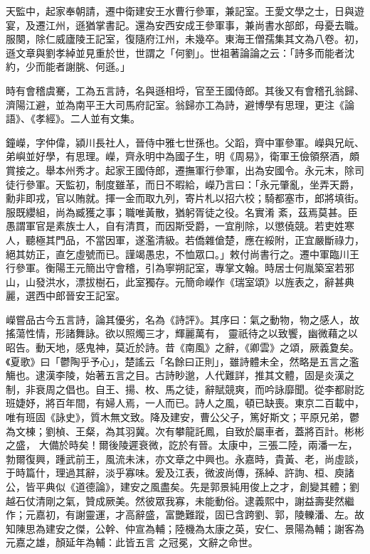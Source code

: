 \begin{pinyinscope}
 天監中，起家奉朝請，遷中衛建安王水曹行參軍，兼記室。王愛文學之士，日與遊宴，及遷江州，遜猶掌書記。還為安西安成王參軍事，兼尚書水部郎，母憂去職。服闋，除仁威廬陵王記室，復隨府江州，未幾卒。東海王僧孺集其文為八卷。初，遜文章與劉孝綽並見重於世，世謂之「何劉」。世祖著論論之云：「詩多而能者沈約，少而能者謝朓、何遜。」



 時有會稽虞騫，工為五言詩，名與遜相埒，官至王國侍郎。其後又有會稽孔翁歸、
 濟陽江避，並為南平王大司馬府記室。翁歸亦工為詩，避博學有思理，更注《論語》、《孝經》。二人並有文集。



 鐘嶸，字仲偉，潁川長社人，晉侍中雅七世孫也。父蹈，齊中軍參軍。嶸與兄岏、弟嶼並好學，有思理。嶸，齊永明中為國子生，明《周易》，衛軍王儉領祭酒，頗賞接之。舉本州秀才。起家王國侍郎，遷撫軍行參軍，出為安國令。永元末，除司徒行參軍。天監初，制度雖革，而日不暇給，嶸乃言曰：「永元肇亂，坐弄天爵，勳非即戎，官以賄就。揮一金而取九列，寄片札以招六校；騎都塞市，郎將填街。服既纓組，尚為臧獲之事；職唯黃散，猶躬胥徒之役。名實淆
 紊，茲焉莫甚。臣愚謂軍官是素族士人，自有清貫，而因斯受爵，一宜削除，以懲僥競。若吏姓寒人，聽極其門品，不當因軍，遂濫清級。若僑雜傖楚，應在綏附，正宜嚴斷祿力，絕其妨正，直乞虛號而已。謹竭愚忠，不恤眾口。」敕付尚書行之。遷中軍臨川王行參軍。衡陽王元簡出守會稽，引為寧朔記室，專掌文翰。時居士何胤築室若邪山，山發洪水，漂拔樹石，此室獨存。元簡命嶸作《瑞室頌》以旌表之，辭甚典麗，選西中郎晉安王記室。



 嶸嘗品古今五言詩，論其優劣，名為《詩評》。其序曰：氣之動物，物之感人，故搖蕩性情，形諸舞詠。欲以照燭三才，輝麗萬有，
 靈祇待之以致饗，幽微藉之以昭告。動天地，感鬼神，莫近於詩。昔《南風》之辭，《卿雲》之頌，厥義夐矣。《夏歌》曰「鬱陶乎予心」，楚謠云「名餘曰正則」，雖詩體未全，然略是五言之濫觴也。逮漢李陵，始著五言之目。古詩眇邈，人代難詳，推其文體，固是炎漢之制，非衰周之倡也。自王、揚、枚、馬之徒，辭賦競爽，而吟詠靡聞。從李都尉訖班婕妤，將百年間，有婦人焉，一人而已。詩人之風，頓已缺喪。東京二百載中，唯有班固《詠史》，質木無文致。降及建安，曹公父子，篤好斯文；平原兄弟，鬱為文棟；劉楨、王粲，為其羽冀。次有攀龍託鳳，自致於屬車者，蓋將百計。彬彬之盛，
 大備於時矣！爾後陵遲衰微，訖於有晉。太康中，三張二陸，兩潘一左，勃爾復興，踵武前王，風流未沫，亦文章之中興也。永嘉時，貴黃、老，尚虛談，于時篇什，理過其辭，淡乎寡味。爰及江表，微波尚傳，孫綽、許詢、桓、庾諸公，皆平典似《道德論》，建安之風盡矣。先是郭景純用俊上之才，創變其體；劉越石仗清剛之氣，贊成厥美。然彼眾我寡，未能動俗。逮義熙中，謝益壽斐然繼作；元嘉初，有謝靈運，才高辭盛，富艷難蹤，固已含跨劉、郭，陵轢潘、左。故知陳思為建安之傑，公幹、仲宣為輔；陸機為太康之英，安仁、景陽為輔；謝客為元嘉之雄，顏延年為輔：此皆五言
 之冠冕，文辭之命世。




\end{pinyinscope}
